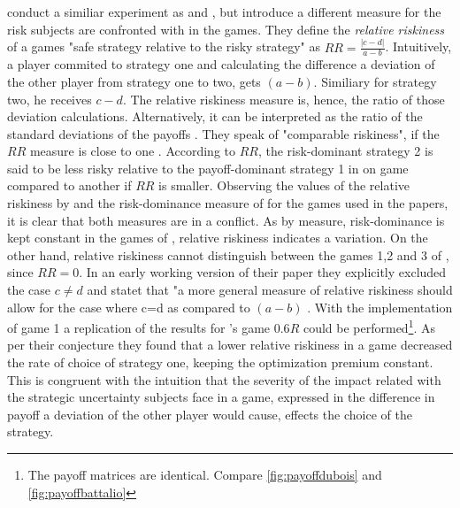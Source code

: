 \documentclass[12pt]{article}
\begin{document}
\textcite{dubois_optimization_2012} conduct a similiar experiment as 
\textcite{schmidt_playing_2003} and \textcite{battalio_optimization_2001},
but introduce a different measure for the risk subjects are confronted with in
the games. They define the \textit{relative riskiness} of a games 
"safe strategy relative to the risky strategy" as $RR = \frac{|c-d|}{a-b}$.
Intuitively, a player commited to strategy one and calculating the 
difference a deviation of the other player from strategy one to two, gets
$(a-b)$. Similiary for strategy two, he receives $c-d$. The relative riskiness
measure is, hence, the ratio of those deviation calculations. Alternatively,
it can be interpreted as the ratio of the standard deviations of the payoffs 
\parencite{dubois_optimization_2012}. They speak of "comparable riskiness",
if the $RR$ measure is close to one \cite{dubois_optimization_2012}. 
According to $RR$, the risk-dominant strategy 2 is said to be less risky 
relative to the payoff-dominant strategy 1 in on game compared to another if 
$RR$ is smaller.
Observing the values of the relative riskiness by 
\textcite{dubois_optimization_2012} and the risk-dominance measure of 
\textcite{schmidt_playing_2003} for the games used in the papers, it is clear
that both measures are in a conflict. As by \textcite{schmidt_playing_2003}
measure, risk-dominance is kept constant in the games of 
\textcite{battalio_optimization_2001}, relative riskiness indicates a 
variation. On the other hand, relative riskiness cannot distinguish between
the games 1,2 and 3 of \textcite{schmidt_playing_2003}, since $RR=0$. In an
early working version of their paper they explicitly excluded the case 
$c \neq d$ and statet that "a more general measure of relative riskiness 
should allow for the case where c=d as compared to $(a-b)$ 
\parencite{dubois_optimization_2008_working}. 
With the implementation of game 1 a replication of the results for 
\textcite{battalio_optimization_2001}'s game $0.6R$ could be 
performed\footnote{The payoff matrices are identical. 
Compare \ref{fig:payoffdubois} and \ref{fig:payoffbattalio}}. 
As per their conjecture they found that a lower relative riskiness in a game 
decreased the rate of choice of strategy one, keeping the optimization premium 
constant. This is congruent with the intuition that the severity of the impact 
related with the strategic uncertainty subjects face in a game, expressed in
the difference in payoff a deviation of the other player would cause,
effects the choice of the strategy. 
\end{document}
